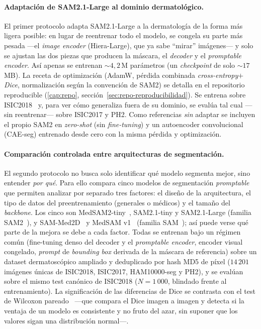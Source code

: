 \paragraph{Adaptación de SAM2.1-Large al dominio dermatológico.}
El primer protocolo adapta SAM2.1-Large a la dermatología de la forma
más ligera posible: en lugar de reentrenar todo el modelo, se congela
su parte más pesada ---el \emph{image encoder} (Hiera-Large), que ya
sabe ``mirar'' imágenes--- y solo se ajustan las dos piezas que
producen la máscara, el \emph{decoder} y el \emph{promptable encoder}.
Así apenas se entrenan $\sim 4{,}2$\,M parámetros (un \emph{checkpoint}
de solo $\sim 17$\,MB). La receta de optimización (AdamW, pérdida
combinada \emph{cross-entropy}$+$\emph{Dice}, normalización según la
convención de SAM2) se detalla en el repositorio reproducible
(\ref{cap:repo}, sección~\ref{sec:repo-reproducibilidad}). Se entrena
sobre ISIC2018~\cite{isic2018} y, para ver cómo generaliza fuera de su
dominio, se evalúa tal cual ---sin reentrenar--- sobre ISIC2017 y PH2.
Como referencias \emph{sin} adaptar se incluyen el propio SAM2 en
\emph{zero-shot} (sin \emph{fine-tuning}) y un autoencoder
convolucional (CAE-seg) entrenado desde cero con la misma pérdida y
optimización.

\paragraph{Comparación controlada entre arquitecturas de
segmentación.}
El segundo protocolo no busca solo identificar qué modelo segmenta
mejor, sino entender \emph{por qué}. Para ello compara cinco modelos
de segmentación \emph{promptable} que permiten analizar por separado
tres factores: el diseño de la arquitectura, el tipo de datos del
preentrenamiento (generales o médicos) y el tamaño del \emph{backbone}.
Los cinco son MedSAM2-tiny~\cite{medsam2}, SAM2.1-tiny y SAM2.1-Large
(familia SAM2~\cite{sam2}), y SAM-Med2D~\cite{sammed2d} y MedSAM
v1~\cite{medsam} (familia SAM~\cite{sam2023}); así puede verse qué
parte de la mejora se debe a cada factor. Todas se entrenan
bajo un régimen común (fine-tuning denso del decoder y
el \emph{promptable encoder}, encoder visual congelado, \emph{prompt}
de \emph{bounding box} derivada de la máscara de referencia) sobre un
dataset dermatoscópico ampliado y deduplicado por hash MD5 de píxel
($14\,201$ imágenes únicas de ISIC2018, ISIC2017, HAM10000-seg y
PH2), y se evalúan sobre el mismo test canónico de ISIC2018
($N = 1\,000$, blindado frente al entrenamiento). La significación
de las diferencias de Dice se contrasta con el test de Wilcoxon
pareado~\cite{wilcoxon1945} ---que compara el Dice imagen a imagen y
detecta si la ventaja de un modelo es consistente y no fruto del azar,
sin suponer que los valores sigan una distribución normal---.

